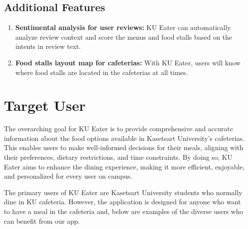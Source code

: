 \subsection{Additional Features}
\label{subsection:additional-features}

\begin{enumerate}[leftmargin=80pt]
    \item \textbf{Sentimental analysis for user reviews:} KU Eater can automatically analyze review context and score the menus and food stalls based on the intents in review text.
    \item \textbf{Food stalls layout map for cafeterias:} With KU Eater, users will know where food stalls are located in the cafeterias at all times.
\end{enumerate}

\section{Target User}
\label{section:target-user}

The overarching goal for KU Eater is to provide comprehensive and accurate information about the food options available in
Kasetsart University's cafeterias. This enables users to make well-informed decisions for their meals,
aligning with their preferences, dietary restrictions, and time constraints. By doing so, KU Eater aims to enhance
the dining experience, making it more efficient, enjoyable, and personalized for every user on campus.

The primary users of KU Eater are Kasetsart University students who normally dine in KU cafeteria.
However, the application is designed for anyone who want to have a meal in the cafeteria and,
below are examples of the diverse users who can benefit from our app.

